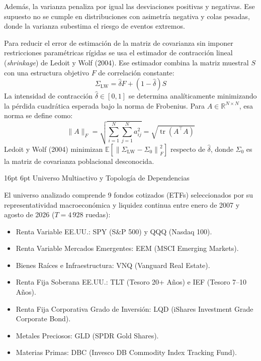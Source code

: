 \documentclass[11pt,a4paper]{article}
\makeatletter
\renewcommand\section{\@startsection{section}{1}{\z@}%
  {16pt \@plus 3pt \@minus 2pt}%
  {6pt}%
  {\centering\large\bfseries\color{navyblue}}}
\makeatother
\begin{document}
Además, la varianza penaliza por igual las desviaciones positivas y negativas. Ese supuesto no se cumple en distribuciones con asimetría negativa y colas pesadas, donde la varianza subestima el riesgo de eventos extremos.

Para reducir el error de estimación de la matriz de covarianza sin imponer restricciones paramétricas rígidas se usa el estimador de contracción lineal (\textit{shrinkage}) de Ledoit y Wolf (2004). Ese estimador combina la matriz muestral $S$ con una estructura objetivo $F$ de correlación constante:
\begin{equation}
\Sigma_{\text{LW}} = \hat{\delta} F + (1 - \hat{\delta}) S
\end{equation}
La intensidad de contracción $\hat{\delta} \in [0, 1]$ se determina analíticamente minimizando la pérdida cuadrática esperada bajo la norma de Frobenius. Para $A \in \mathbb{R}^{N \times N}$, esa norma se define como:
\begin{equation}
\|A\|_F = \sqrt{\sum_{i=1}^{N} \sum_{j=1}^{N} a_{ij}^2} = \sqrt{\operatorname{tr}\left(A^\top A\right)}
\end{equation}
Ledoit y Wolf (2004) minimizan $\mathbb{E}\left[\left\|\Sigma_{\text{LW}} - \Sigma_0\right\|_F^2\right]$ respecto de $\hat{\delta}$, donde $\Sigma_0$ es la matriz de covarianza poblacional desconocida.

\section{Universo Multiactivo y Topología de Dependencias}

El universo analizado comprende 9 fondos cotizados (ETFs) seleccionados por su representatividad macroeconómica y liquidez continua entre enero de 2007 y agosto de 2026 ($T = 4\,928$ ruedas):
\begin{itemize}
    \item Renta Variable EE.UU.: SPY (S\&P 500) y QQQ (Nasdaq 100).
    \item Renta Variable Mercados Emergentes: EEM (MSCI Emerging Markets).
    \item Bienes Raíces e Infraestructura: VNQ (Vanguard Real Estate).
    \item Renta Fija Soberana EE.UU.: TLT (Tesoro 20+ Años) e IEF (Tesoro 7--10 Años).
    \item Renta Fija Corporativa Grado de Inversión: LQD (iShares Investment Grade Corporate Bond).
    \item Metales Preciosos: GLD (SPDR Gold Shares).
    \item Materias Primas: DBC (Invesco DB Commodity Index Tracking Fund).
\end{itemize}
\end{document}
